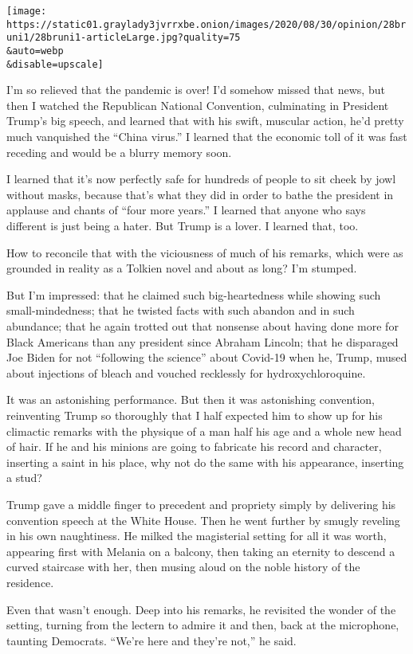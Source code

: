 \texttt{[image: https://static01.graylady3jvrrxbe.onion/images/2020/08/30/opinion/28bruni1/28bruni1-articleLarge.jpg?quality=75\\\&auto=webp\\\&disable=upscale]}

I'm so relieved that the pandemic is over! I'd somehow missed that news,
but then I watched the Republican National Convention, culminating in
President Trump's big speech, and learned that with his swift, muscular
action, he'd pretty much vanquished the ``China virus.'' I learned that
the economic toll of it was fast receding and would be a blurry memory
soon.

I learned that it's now perfectly safe for hundreds of people to sit
cheek by jowl without masks, because that's what they did in order to
bathe the president in applause and chants of ``four more years.'' I
learned that anyone who says different is just being a hater. But Trump
is a lover. I learned that, too.

How to reconcile that with the viciousness of much of his remarks, which
were as grounded in reality as a Tolkien novel and about as long? I'm
stumped.

But I'm impressed: that he claimed such big-heartedness while showing
such small-mindedness; that he twisted facts with such abandon and in
such abundance; that he again trotted out that nonsense about having
done more for Black Americans than any president since Abraham Lincoln;
that he disparaged Joe Biden for not ``following the science'' about
Covid-19 when he, Trump, mused about injections of bleach and vouched
recklessly for hydroxychloroquine.

It was an astonishing performance. But then it was astonishing
convention, reinventing Trump so thoroughly that I half expected him to
show up for his climactic remarks with the physique of a man half his
age and a whole new head of hair. If he and his minions are going to
fabricate his record and character, inserting a saint in his place, why
not do the same with his appearance, inserting a stud?

Trump gave a middle finger to precedent and propriety simply by
delivering his convention speech at the White House. Then he went
further by smugly reveling in his own naughtiness. He milked the
magisterial setting for all it was worth, appearing first with Melania
on a balcony, then taking an eternity to descend a curved staircase with
her, then musing aloud on the noble history of the residence.

Even that wasn't enough. Deep into his remarks, he revisited the wonder
of the setting, turning from the lectern to admire it and then, back at
the microphone, taunting Democrats. ``We're here and they're not,'' he
said.

